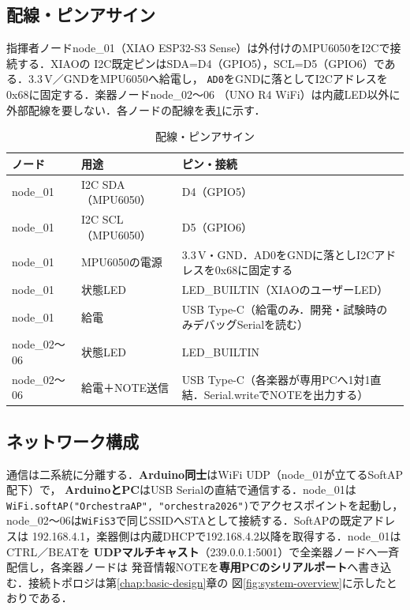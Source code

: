 \documentclass[lualatex,book,paper=a4paper,jafontsize=11.5pt,jafontscale=1.05]{jlreq}
\begin{document}
\subsection{配線・ピンアサイン}
指揮者ノードnode\_01（XIAO ESP32-S3 Sense）は外付けのMPU6050をI2Cで接続する．XIAOの
I2C既定ピンはSDA=D4（GPIO5），SCL=D5（GPIO6）である．3.3\,V／GNDをMPU6050へ給電し，
\texttt{AD0}をGNDに落としてI2Cアドレスを0x68に固定する．楽器ノードnode\_02〜06
（UNO R4 WiFi）は内蔵LED以外に外部配線を要しない．各ノードの配線を表\ref{tab:pin-assign}に示す．
\begin{table}[H]\centering
  \caption{配線・ピンアサイン}\label{tab:pin-assign}
  \small
  \begin{tabularx}{\linewidth}{>{\raggedright\arraybackslash}p{2.2cm} >{\raggedright\arraybackslash}p{3.6cm} X}
    \toprule
    ノード & 用途 & ピン・接続 \\
    \midrule
    node\_01 & I2C SDA（MPU6050） & D4（GPIO5） \\
    node\_01 & I2C SCL（MPU6050） & D5（GPIO6） \\
    node\_01 & MPU6050の電源 & 3.3\,V・GND．AD0をGNDに落としI2Cアドレスを0x68に固定する \\
    node\_01 & 状態LED & LED\_BUILTIN（XIAOのユーザーLED） \\
    node\_01 & 給電 & USB Type-C（給電のみ．開発・試験時のみデバッグSerialを読む） \\
    node\_02〜06 & 状態LED & LED\_BUILTIN \\
    node\_02〜06 & 給電＋NOTE送信 & USB Type-C（各楽器が専用PCへ1対1直結．Serial.writeでNOTEを出力する） \\
    \bottomrule
  \end{tabularx}
\end{table}

\subsection{ネットワーク構成}
通信は二系統に分離する．\textbf{Arduino同士}はWiFi UDP（node\_01が立てるSoftAP配下）で，
\textbf{ArduinoとPC}はUSB Serialの直結で通信する．node\_01は
\texttt{WiFi.softAP("OrchestraAP", "orchestra2026")}でアクセスポイントを起動し，
node\_02〜06は\texttt{WiFiS3}で同じSSIDへSTAとして接続する．SoftAPの既定アドレスは
192.168.4.1，楽器側は内蔵DHCPで192.168.4.2以降を取得する．node\_01はCTRL／BEATを
\textbf{UDPマルチキャスト}（239.0.0.1:5001）で全楽器ノードへ一斉配信し，各楽器ノードは
発音情報NOTEを\textbf{専用PCのシリアルポート}へ書き込む．接続トポロジは第\ref{chap:basic-design}章の
図\ref{fig:system-overview}に示したとおりである．
\end{document}
